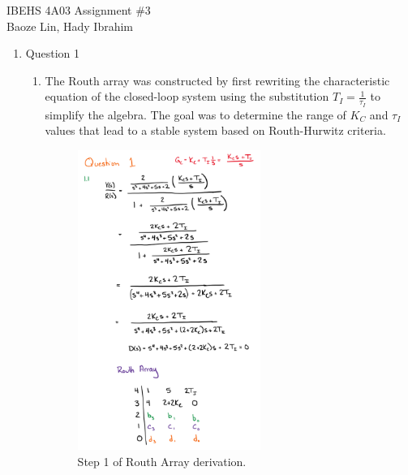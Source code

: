 \documentclass[12pt]{article}
\begin{document}
IBEHS 4A03 \hfill Assignment \#3\\
Baoze Lin, Hady Ibrahim

\hrulefill

\renewcommand{\theenumii}{\arabic{enumi}.\arabic{enumii}}

\begin{enumerate}
  \item Question 1
    \begin{enumerate}
    
      \item 
      The Routh array was constructed by first rewriting the characteristic equation of the closed-loop system using the substitution $T_I = \frac{1}{\tau_I}$ to simplify the algebra. The goal was to determine the range of $K_C$ and $\tau_I$ values that lead to a stable system based on Routh-Hurwitz criteria.
  
      \begin{figure}[H]
        \centering
        \includegraphics[width=0.6\textwidth]{Figures/figure1-1a.png}
        \caption{Step 1 of Routh Array derivation.}
      \end{figure}
  

\end{enumerate}
\end{enumerate}
\end{document}

